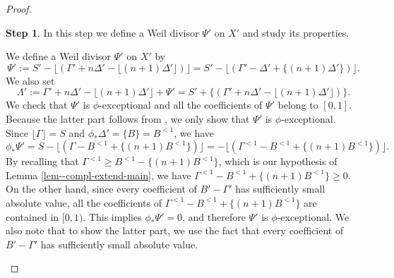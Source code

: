 \documentclass[12pt]{amsart}
\theoremstyle{definition}
\newtheorem{step1}{Step}
\begin{document}
\begin{proof}
\begin{step1}\label{step2--lem-compl-extend-main}
In this step we define a Weil divisor $\Psi'$ on $X'$ and study its properties.  

We define a Weil divisor $\Psi'$ on $X'$ by
\begin{equation}\label{lem--compl-extend-main-(Psi)}
\Psi' := S' - \lfloor (\Gamma' +n\Delta' - \lfloor (n+1)\Delta' \rfloor)\rfloor = S' - \lfloor (\Gamma' -\Delta' + \{ (n+1)\Delta' \})\rfloor.
\end{equation}
We also set
\begin{equation}\label{lem--compl-extend-main-(Lambda)}
\Lambda':=\Gamma' +n\Delta' - \lfloor (n+1)\Delta' \rfloor  +\Psi'=S'+\{(\Gamma' +n\Delta' - \lfloor (n+1)\Delta'\rfloor)\}.
\end{equation}
We check that $\Psi'$ is $\phi$-exceptional and all the coefficients of $\Psi'$ belong to $[0,1]$. 
Because the latter part follows from \cite[Step 4 in the proof of Proposition 8.1]{birkar-compl}, we only show that $\Psi'$ is $\phi$-exceptional. 
Since $\lfloor \Gamma \rfloor =S$ and $\phi_{*}\Delta'=\{B\}=B^{<1}$, we have 
$$\phi_{*}\Psi'=S - \lfloor (\Gamma -B^{<1} + \{ (n+1)B^{<1} \})\rfloor=- \lfloor (\Gamma^{<1} -B^{<1} + \{ (n+1)B^{<1} \})\rfloor.$$
By recalling that $\Gamma^{<1}\geq B^{<1}-\{(n+1)B^{<1}\}$, which is our hypothesis of Lemma \ref{lem--compl-extend-main}, we have $\Gamma^{<1} -B^{<1} + \{ (n+1)B^{<1} \} \geq 0$. 
On the other hand, since every coefficient of $B'-\Gamma'$ has sufficiently small absolute value, all the coefficients of $\Gamma^{<1} -B^{<1} + \{ (n+1)B^{<1} \}$ are contained in $[0,1)$. 
This implies $\phi_{*}\Psi' = 0$, and therefore $\Psi'$ is $\phi$-exceptional. 
We also note that to show the latter part, we use the fact that every coefficient of $B'-\Gamma'$ has sufficiently small absolute value. 
\end{step1}


\end{proof}
\end{document}
